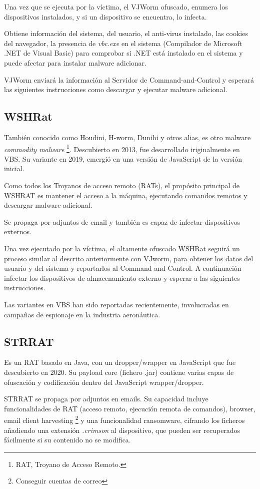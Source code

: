 \documentclass[15pt]{article}
\begin{document}
	Una vez que se ejecuta por la víctima, el VJWorm ofuscado, enumera los dispositivos instalados, y si un dispositivo se encuentra, lo infecta.
	
	Obtiene información del sistema, del usuario, el anti-virus instalado, las cookies del navegador, la presencia de \textit{vbc.exe} en el sistema (Compilador de Microsoft .NET de Visual Basic) para comprobar si .NET está instalado en el sistema y puede afectar para instalar malware adicionar.
	
	VJWorm enviará la información al Servidor de Command-and-Control y esperará las siguientes instrucciones como descargar y ejecutar malware adicional.
	
	\subsection{WSHRat}
	
	También conocido como Houdini, H-worm, Dunihi y otros alias, es otro malware \textit{commodity malware} \footnote{RAT, Troyano de Acceso Remoto.}. Descubierto en 2013, fue desarrollado iriginalmente en VBS. Su variante en 2019, emergió en una versión de JavaScript de la versión inicial.
	
	Como todos los Troyanos de acceso remoto (RATs), el propósito principal de WSHRAT es mantener el acceso a la máquina, ejecutando comandos remotos y descargar malware adicional.
	
	Se propaga por adjuntos de email y también es capaz de infectar dispositivos externos.
	
	Una vez ejecutado por la víctima, el altamente ofuscado WSHRat seguirá un proceso similar al descrito anteriormente con VJworm, para obtener los datos del usuario y del sistema y reportarlos al Command-and-Control. A continuación infectar los dispositivos de almacenamiento externo y esperar a las siguientes instrucciones.
	
	Las variantes en VBS han sido reportadas recientemente, involucradas en campañas de espionaje en la industria aeronáutica.
	
	\subsection{STRRAT}
	Es un RAT basado en Java, con un dropper/wrapper en JavaScript que fue descubierto en 2020. Su payload core (fichero .jar) contiene varias capas de ofuscación y codificación dentro del JavaScript wrapper/dropper.
	
	STRRAT se propaga por adjuntos en emails. Su capacidad incluye funcionalidades de RAT (acceso remoto, ejecución remota de comandos), browser, email client harvesting \footnote{Conseguir cuentas de correo} y una funcionalidad ransomware, cifrando los ficheros añadiendo una extensión \textit{.crimson} al dispositivo, que pueden ser recuperados fácilmente si su contenido no se modifica.
	
\end{document}
